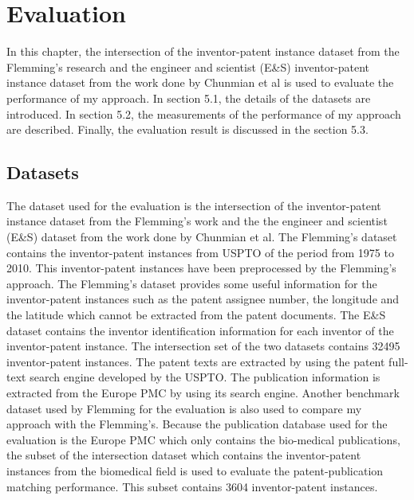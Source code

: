 \chapter{Evaluation}
\label{cha:eval}
In this chapter, the intersection of the inventor-patent instance dataset from the Flemming's research and the engineer and scientist (E\&S) inventor-patent instance dataset from the work done by Chunmian et al is used to evaluate the performance of my approach.  In section 5.1, the details of the datasets are introduced. In section 5.2, the measurements of the performance of my approach are described. Finally, the evaluation result is discussed in the section 5.3. 

\section{Datasets}
The dataset used for the evaluation is the intersection of the inventor-patent instance dataset from the Flemming's work and the the engineer and scientist (E\&S) dataset from the work done by Chunmian et al. The Flemming's dataset contains the inventor-patent instances from USPTO of the period from 1975 to 2010. This inventor-patent instances have been preprocessed by the Flemming's approach. The Flemming's dataset provides some useful information for the inventor-patent instances such as the patent assignee number, the longitude and the latitude which cannot be extracted from the patent documents. The E\&S dataset contains the inventor identification information for each inventor of the inventor-patent instance.  The intersection set of the two datasets contains 32495 inventor-patent instances. The patent texts are extracted by using the patent full-text search engine developed by the USPTO.  The publication information is extracted from the Europe PMC by using its search engine. Another benchmark dataset \cite{RePEc:eee:respol:v:43:y:2014:i:6:p:941-955} used by Flemming for the evaluation is also used to compare my approach with the Flemming's. Because the publication database used for the evaluation is the Europe PMC which only contains the bio-medical publications, the subset of the intersection dataset which contains the inventor-patent instances from the biomedical field is used to evaluate the patent-publication matching performance. This subset contains 3604 inventor-patent instances. 

